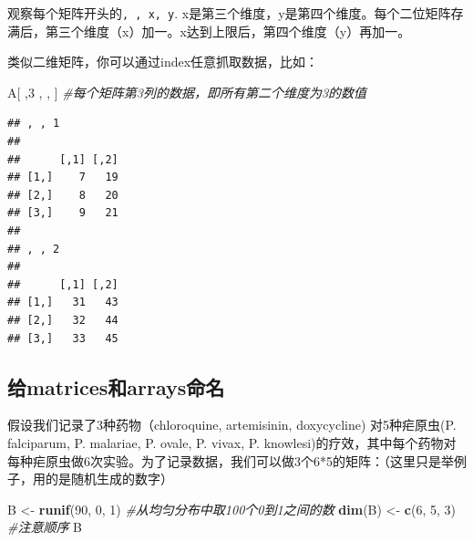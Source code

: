 \documentclass[]{book}
\newenvironment{Shaded}{\begin{snugshade}}{\end{snugshade}}
\newcommand{\CommentTok}[1]{\textcolor[rgb]{0.56,0.35,0.01}{\textit{#1}}}
\newcommand{\DecValTok}[1]{\textcolor[rgb]{0.00,0.00,0.81}{#1}}
\newcommand{\KeywordTok}[1]{\textcolor[rgb]{0.13,0.29,0.53}{\textbf{#1}}}
\newcommand{\NormalTok}[1]{#1}
\newcommand{\StringTok}[1]{\textcolor[rgb]{0.31,0.60,0.02}{#1}}
\begin{document}
观察每个矩阵开头的\texttt{,\ ,\ x,\ y}. x是第三个维度，y是第四个维度。每个二位矩阵存满后，第三个维度（x）加一。x达到上限后，第四个维度（y）再加一。

类似二维矩阵，你可以通过index任意抓取数据，比如：

\begin{Shaded}
\begin{Highlighting}[]
\NormalTok{A[ ,}\DecValTok{3}\NormalTok{ , , ] }\CommentTok{#每个矩阵第3列的数据，即所有第二个维度为3的数值}
\end{Highlighting}
\end{Shaded}

\begin{verbatim}
## , , 1
## 
##      [,1] [,2]
## [1,]    7   19
## [2,]    8   20
## [3,]    9   21
## 
## , , 2
## 
##      [,1] [,2]
## [1,]   31   43
## [2,]   32   44
## [3,]   33   45
\end{verbatim}

\hypertarget{matrix-array-naming}{%
\subsection{给matrices和arrays命名}\label{matrix-array-naming}}

假设我们记录了3种药物（chloroquine, artemisinin, doxycycline)
对5种疟原虫(P. falciparum, P. malariae, P. ovale, P. vivax, P. knowlesi)的疗效，其中每个药物对每种疟原虫做6次实验。为了记录数据，我们可以做3个6*5的矩阵：（这里只是举例子，用的是随机生成的数字）

\begin{Shaded}
\begin{Highlighting}[]
\NormalTok{B <-}\StringTok{ }\KeywordTok{runif}\NormalTok{(}\DecValTok{90}\NormalTok{, }\DecValTok{0}\NormalTok{, }\DecValTok{1}\NormalTok{) }\CommentTok{#从均匀分布中取100个0到1之间的数}
\KeywordTok{dim}\NormalTok{(B) <-}\StringTok{ }\KeywordTok{c}\NormalTok{(}\DecValTok{6}\NormalTok{, }\DecValTok{5}\NormalTok{, }\DecValTok{3}\NormalTok{) }\CommentTok{#注意顺序}
\NormalTok{B}
\end{Highlighting}
\end{Shaded}
\end{document}
